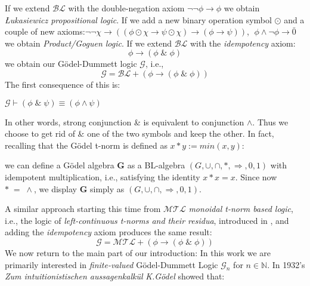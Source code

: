  If we extend $\mathcal{BL}$ with the double-negation axiom $\neg\neg \phi \rightarrow \phi$ we obtain \emph{\L{}ukasiewicz propositional logic}.\newline
 If we add a new binary operation symbol $\odot$ and a couple of new axioms:\newline $\neg\neg \chi \rightarrow ((\phi \odot \chi \rightarrow \psi \odot \chi)\rightarrow (\phi \rightarrow \psi))$, $\;\phi \land \neg \phi \rightarrow \bar{0}$ we obtain \emph{Product/Goguen logic}.\newline\newline
 If we extend $\mathcal{BL}$ with the \emph{idempotency} axiom:
 \[ \phi \rightarrow (\phi \;\&\; \phi)\] 
 we obtain our Gödel-Dummett logic $\mathcal{G}$, i.e.,
 \[ \mathcal{G} = \mathcal{BL} + (\phi \rightarrow (\phi \;\&\; \phi))\]
  The first consequence of this is:
 \begin{lem}
 	$\mathcal{G} \vdash (\phi \;\&\; \psi) \equiv (\phi \land \psi)$ 
 \end{lem}
 In other words, strong conjunction \& is equivalent to conjunction $\land$. Thus we choose to get rid of \& one of the two symbols and keep the other.\newline
 In fact, recalling that the Gödel t-norm is defined as $x*y := min(x,y)$:
 \begin{remark}
 	we can define a Gödel algebra \textbf{G} as a BL-algebra $(G,\cup,\cap,*,\Rightarrow,0,1)$ with idempotent multiplication, i.e., satisfying the identity $x*x=x$.\newline
 	Since now $* \;=\; \land$, we display \textbf{G} simply as $(G,\cup,\cap,\Rightarrow,0,1)$.
 \end{remark}
  A similar approach starting this time from $\mathcal{MTL}$ \emph{monoidal t-norm based logic}, i.e., the logic of \emph{left-continuous t-norms and their residua}, introduced in \cite{mtl}, and adding the \emph{idempotency} axiom produces the same result:
    \[ \mathcal{G} = \mathcal{MTL} + (\phi \rightarrow (\phi \;\&\; \phi))\]
We now return to the main part of our introduction: \newline
In this work we are primarily interested in \emph{finite-valued} Gödel-Dummett Logic $\mathcal{G}_n$ for $n \in \mathbb{N}$.\newline
		 In 1932's \emph{Zum intuitionistischen aussagenkalkül} \cite{godel} \emph{K.Gödel} showed that:
		 
